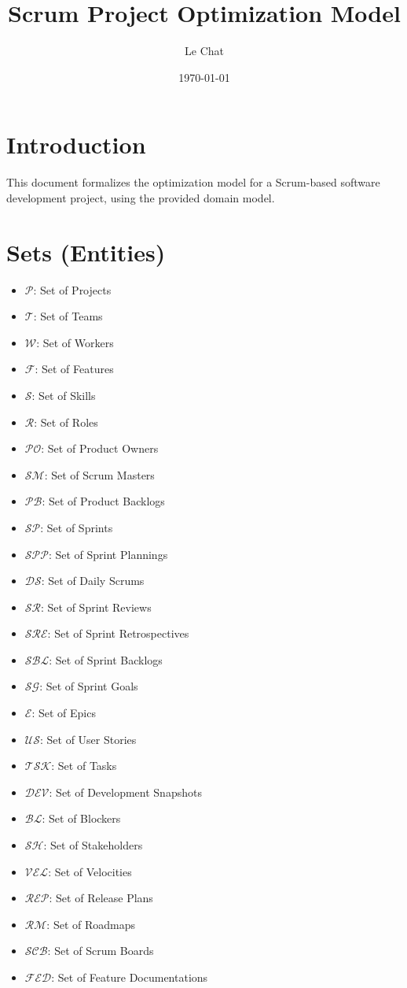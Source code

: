 \documentclass{article}
\title{Scrum Project Optimization Model}
\author{Le Chat}
\date{\today}
\begin{document}
\maketitle
\tableofcontents

\section{Introduction}
This document formalizes the optimization model for a Scrum-based software development project, using the provided domain model.

\section{Sets (Entities)}
\begin{itemize}
    \item $\mathcal{P}$: Set of Projects
    \item $\mathcal{T}$: Set of Teams
    \item $\mathcal{W}$: Set of Workers
    \item $\mathcal{F}$: Set of Features
    \item $\mathcal{S}$: Set of Skills
    \item $\mathcal{R}$: Set of Roles
    \item $\mathcal{PO}$: Set of Product Owners
    \item $\mathcal{SM}$: Set of Scrum Masters
    \item $\mathcal{PB}$: Set of Product Backlogs
    \item $\mathcal{SP}$: Set of Sprints
    \item $\mathcal{SPP}$: Set of Sprint Plannings
    \item $\mathcal{DS}$: Set of Daily Scrums
    \item $\mathcal{SR}$: Set of Sprint Reviews
    \item $\mathcal{SRE}$: Set of Sprint Retrospectives
    \item $\mathcal{SBL}$: Set of Sprint Backlogs
    \item $\mathcal{SG}$: Set of Sprint Goals
    \item $\mathcal{E}$: Set of Epics
    \item $\mathcal{US}$: Set of User Stories
    \item $\mathcal{TSK}$: Set of Tasks
    \item $\mathcal{DEV}$: Set of Development Snapshots
    \item $\mathcal{BL}$: Set of Blockers
    \item $\mathcal{SH}$: Set of Stakeholders
    \item $\mathcal{VEL}$: Set of Velocities
    \item $\mathcal{REP}$: Set of Release Plans
    \item $\mathcal{RM}$: Set of Roadmaps
    \item $\mathcal{SCB}$: Set of Scrum Boards
    \item $\mathcal{FED}$: Set of Feature Documentations
\end{itemize}
\end{document}
